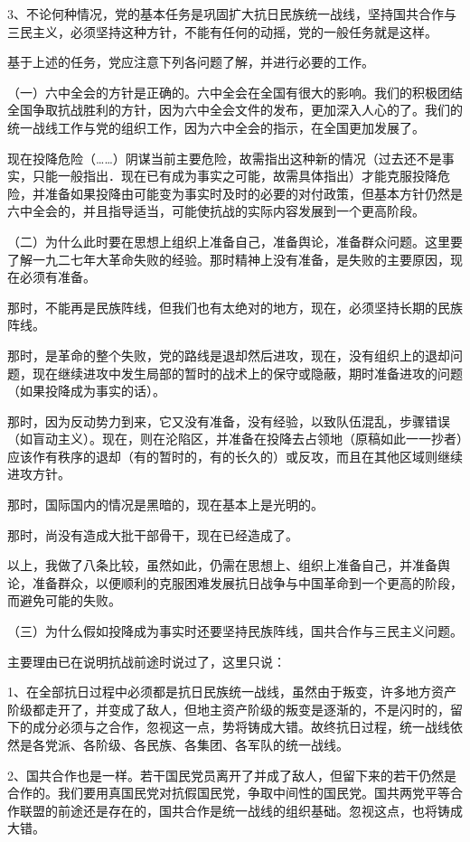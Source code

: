 3、不论何种情况，党的基本任务是巩固扩大抗日民族统一战线，坚持国共合作与三民主义，必须坚持这种方针，不能有任何的动摇，党的一般任务就是这样。

基于上述的任务，党应注意下列各问题了解，并进行必要的工作。

（一）六中全会的方针是正确的。六中全会在全国有很大的影响。我们的积极团结全国争取抗战胜利的方针，因为六中全会文件的发布，更加深入人心的了。我们的统一战线工作与党的组织工作，因为六中全会的指示，在全国更加发展了。

现在投降危险（……）阴谋当前主要危险，故需指出这种新的情况（过去还不是事实，只能一般指出．现在已有成为事实之可能，故需具体指出）才能克服投降危险，并准备如果投降由可能变为事实时及时的必要的对付政策，但基本方针仍然是六中全会的，并且指导适当，可能使抗战的实际内容发展到一个更高阶段。

（二）为什么此时要在思想上组织上准备自己，准备舆论，准备群众问题。这里要了解一九二七年大革命失败的经验。那时精神上没有准备，是失败的主要原因，现在必须有准备。

那时，不能再是民族阵线，但我们也有太绝对的地方，现在，必须坚持长期的民族阵线。

那时，是革命的整个失败，党的路线是退却然后进攻，现在，没有组织上的退却问题，现在继续进攻中发生局部的暂时的战术上的保守或隐蔽，期时准备进攻的问题（如果投降成为事实的话）。

那时，因为反动势力到来，它又没有准备，没有经验，以致队伍混乱，步骤错误（如盲动主义）。现在，则在沦陷区，并准备在投降去占领地（原稿如此一一抄者）应该作有秩序的退却（有的暂时的，有的长久的）或反攻，而且在其他区域则继续进攻方针。

那时，国际国内的情况是黑暗的，现在基本上是光明的。

那时，尚没有造成大批干部骨干，现在已经造成了。

以上，我做了八条比较，虽然如此，仍需在思想上、组织上准备自己，并准备舆论，准备群众，以便顺利的克服困难发展抗日战争与中国革命到一个更高的阶段，而避免可能的失败。

（三）为什么假如投降成为事实时还要坚持民族阵线，国共合作与三民主义问题。

主要理由已在说明抗战前途时说过了，这里只说：

1、在全部抗日过程中必须都是抗日民族统一战线，虽然由于叛变，许多地方资产阶级都走开了，并变成了敌人，但地主资产阶级的叛变是逐渐的，不是闪时的，留下的成分必须与之合作，忽视这一点，势将铸成大错。故终抗日过程，统一战线依然是各党派、各阶级、各民族、各集团、各军队的统一战线。

2、国共合作也是一样。若干国民党员离开了并成了敌人，但留下来的若干仍然是合作的。我们要用真国民党对抗假国民党，争取中间性的国民党。国共两党平等合作联盟的前途还是存在的，国共合作是统一战线的组织基础。忽视这点，也将铸成大错。

